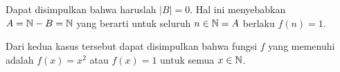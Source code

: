 \begin{solusi}
\begin{itemize}
        Dapat disimpulkan bahwa haruslah $|B|=0$. Hal ini menyebabkan $A = \mathbb N - B = \mathbb N$ yang berarti untuk seluruh $n \in \mathbb N=A$ berlaku $f(n)=1$.
    \end{itemize}
    Dari kedua kasus tersebut dapat disimpulkan bahwa fungsi $f$ yang memenuhi adalah $f(x)=x^2$ atau $f(x)=1$ untuk semua $x \in \mathbb N$.
\end{solusi}

